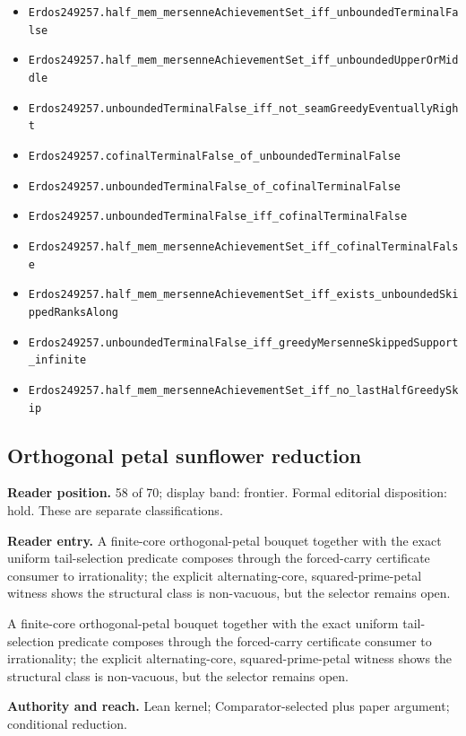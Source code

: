 \begin{itemize}
  \item \nolinkurl{Erdos249257.half_mem_mersenneAchievementSet_iff_unboundedTerminalFalse}
  \item \nolinkurl{Erdos249257.half_mem_mersenneAchievementSet_iff_unboundedUpperOrMiddle}
  \item \nolinkurl{Erdos249257.unboundedTerminalFalse_iff_not_seamGreedyEventuallyRight}
  \item \nolinkurl{Erdos249257.cofinalTerminalFalse_of_unboundedTerminalFalse}
  \item \nolinkurl{Erdos249257.unboundedTerminalFalse_of_cofinalTerminalFalse}
  \item \nolinkurl{Erdos249257.unboundedTerminalFalse_iff_cofinalTerminalFalse}
  \item \nolinkurl{Erdos249257.half_mem_mersenneAchievementSet_iff_cofinalTerminalFalse}
  \item \nolinkurl{Erdos249257.half_mem_mersenneAchievementSet_iff_exists_unboundedSkippedRanksAlong}
  \item \nolinkurl{Erdos249257.unboundedTerminalFalse_iff_greedyMersenneSkippedSupport_infinite}
  \item \nolinkurl{Erdos249257.half_mem_mersenneAchievementSet_iff_no_lastHalfGreedySkip}
\end{itemize}

\subsection{Orthogonal petal sunflower reduction}
\textbf{Reader position.} 58 of 70; display band: frontier.  Formal editorial disposition: hold.  These are separate classifications.

\textbf{Reader entry.} A finite-core orthogonal-petal bouquet together with the exact uniform tail-selection predicate composes through the forced-carry certificate consumer to irrationality; the explicit alternating-core, squared-prime-petal witness shows the structural class is non-vacuous, but the selector remains open.

A finite-core orthogonal-petal bouquet together with the exact uniform tail-selection predicate composes through the forced-carry certificate consumer to irrationality; the explicit alternating-core, squared-prime-petal witness shows the structural class is non-vacuous, but the selector remains open.

\textbf{Authority and reach.} Lean kernel; Comparator-selected plus paper argument; conditional reduction.

